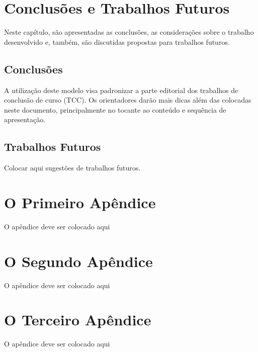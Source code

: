 \documentclass[
        oneside,      %
        english,			
        brazil			 
        ]{configcefetmglpd}
\begin{document}
\chapter{Conclusões e Trabalhos Futuros}

Neste capítulo, são apresentadas as conclusões, as considerações sobre o trabalho desenvolvido e, também, são discutidas propostas para trabalhos futuros.

\section{Conclusões}
A utilização deste modelo visa padronizar a parte editorial dos trabalhos de conclusão de curso (TCC). Os orientadores darão mais dicas além das colocadas neste documento, principalmente no tocante ao conteúdo e sequência de apresentação.

\section{Trabalhos Futuros}
Colocar aqui sugestões de trabalhos futuros.


\postextual 





\begin{apendices}

\chapter{\apendseq O Primeiro Apêndice} 

O apêndice deve ser colocado aqui


\chapter{\apendseq O Segundo Apêndice} 

O apêndice deve ser colocado aqui 


\chapter{\apendseq O Terceiro Apêndice} 

O apêndice deve ser colocado aqui 


\end{apendices}
\end{document}
